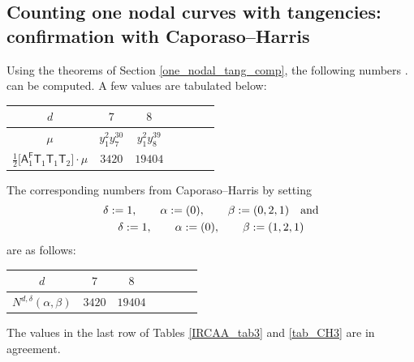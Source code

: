 \documentclass[pdftex]{sigma}
\numberwithin{equation}{section}
\begin{document}
\subsection[Counting one nodal curves with tangencies: confirmation with Caporaso-Harris]{Counting one nodal curves with tangencies:\\ confirmation with Caporaso--Harris}

Using the theorems of Section \ref{one_nodal_tang_comp}, the following numbers
.
can be computed. A few values are tabulated below:
\begin{center}\renewcommand{\arraystretch}{1.2}
\begin{tabular}{|c|c|c|c|c|c|c|}
\hline
$d$ & $7$ & $8$ \\
\hline
$\mu$ & $y_1^2 y_7^{30}$ & $y_1^2 y_8^{39}$ \\
\hline
$\frac{1}{2}\bigl[\mathsf{A}_1^{\mathsf{F}}\mathsf{T}_{1} \mathsf{T}_{1} \mathsf{T}_{2}\bigr] \cdot \mu$
& $3420$ & $19404$ \\
\hline
\end{tabular}
 \label{IRCAA_tab3}
\end{center}
The corresponding numbers from Caporaso--Harris
by setting
\begin{gather*}
\delta:=1, \qquad \alpha:= (0),  \qquad \beta:=(0,2,1) \quad \textnormal{and} \\
\delta:=1, \qquad \alpha:= (0),  \qquad \beta:=(1,2,1)
\end{gather*}
are as follows:{\samepage
\begin{center}\renewcommand{\arraystretch}{1.2}
\begin{tabular}{|c|c|c|c|c|c|c|}
\hline
$d$ & $7$ & $8$ \\
\hline
$N^{d,\delta}(\alpha, \beta)$ & $3420$ & $19404$ \\
\hline
\end{tabular}
 \label{tab_CH3}
\end{center}
The values in the last row of Tables \ref{IRCAA_tab3} and \ref{tab_CH3}
are in agreement.}
\end{document}
